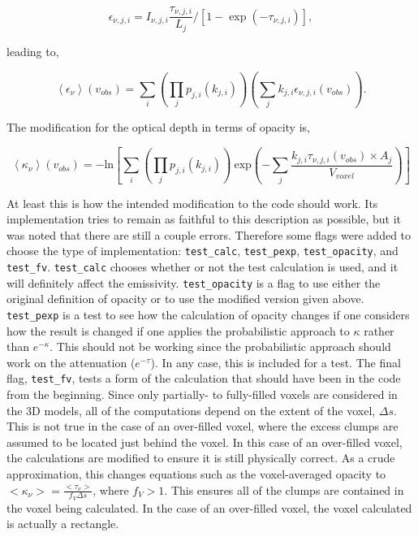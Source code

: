 \documentclass[a4paper]{article}
\begin{document}
    \[
    \epsilon_{\nu,j,i} = I_{\nu,j,i} \frac{\tau_{\nu,j,i}} {L_{j}} / [ 1 - \exp(-\tau_{\nu,j,i}) ],
    \]

    leading to,

    \[
    \left< \epsilon_\nu \right> (v_{obs}) = \sum_i \left( \prod_j p_{j,i}(k_{j,i}) \right) \left( \sum_j k_{j,i} \epsilon_{\nu,j,i} (v_{obs}) \right).
    \]

    The modification for the optical depth in terms of opacity is,

    \[
    \left< \kappa_\nu \right> (v_{obs}) = -\mathrm{ln} \left[ \sum_i \left( \prod_j p_{j,i}(k_{j,i}) \right) \ \mathrm{exp} \left( - \sum_j \frac{k_{j,i} \tau_{\nu,j,i} (v_{obs}) \times A_{j}}{V_{voxel}} \right) \right]
    \]

    At least this is how the intended modification to the code should work.
    Its implementation tries to remain as faithful to this description as possible, but it was noted that there are still a couple errors.
    Therefore some flags were added to choose the type of implementation: \texttt{test\_calc}, \texttt{test\_pexp}, \texttt{test\_opacity}, and \texttt{test\_fv}.
    \texttt{test\_calc} chooses whether or not the test calculation is used, and it will definitely affect the emissivity.
    \texttt{test\_opacity} is a flag to use either the original definition of opacity or to use the modified version given above.
    \texttt{test\_pexp} is a test to see how the calculation of opacity changes if one considers how the result is changed if one applies the probabilistic approach to \(\kappa\) rather than \(e^{-\kappa}\).
    This should not be working since the probabilistic approach should work on the attenuation (\(e^{-\tau}\)).
    In any case, this is included for a test.
    The final flag, \texttt{test\_fv}, tests a form of the calculation that should have been in the code from the beginning.
    Since only partially- to fully-filled voxels are considered in the 3D models, all of the computations depend on the extent of the voxel, \(\Delta s\).
    This is not true in the case of an over-filled voxel, where the excess clumps are assumed to be located just behind the voxel.
    In this case of an over-filled voxel, the calculations are modified to ensure it is still physically correct.
    As a crude approximation, this changes equations such as the voxel-averaged opacity to \(<\kappa_\nu> = \frac{<\tau_\nu>}{f_V \Delta s}\), where \(f_V > 1\).
    This ensures all of the clumps are contained in the voxel being calculated.
    In the case of an over-filled voxel, the voxel calculated is actually a rectangle.
\end{document}
